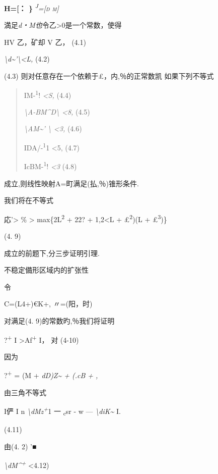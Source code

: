 \documentclass{article}
\begin{document}
\textbf{H={[}： \}} \emph{\textsc{\textsuperscript{J}={[}d m{]}}}

満足\emph{d・M也}令乙\textgreater{}0是一个常数，使得

\textbar{}\textbar{}H\textbar{}\textbar{}V 乙，\textbar{}\textbar{}矿却
V 乙， (4.1)

\emph{\textbackslash{}d\textasciitilde{}'\textbackslash{}\textless{}L,}
(4.2)

(4.3) 则对任意存在一个依赖于£，内,％的正常数凯 如果下列不等式

\begin{quote}
IM-\textsuperscript{1}! \emph{\textless{}S,} (4.4)

\emph{\textbackslash{}A-BM\^{}D\textbackslash{} \textless{}8,} (4.5)

\emph{\textbackslash{}AM\textasciitilde{}' \textbackslash{}
\textless{}3,} (4.6)

IDA/-\textsuperscript{1}1 \textless{}5, (4.7)

IcBM-\textsuperscript{1}! \emph{\textless{}3} (4.8)
\end{quote}

成立,则线性映射A=町满足(払,％)锥形条件.

我们将在不等式

応'\textgreater{} \% \textgreater{} max\{2L\textsuperscript{2} + 22? +
1,2\textless{}L + £\textsuperscript{2})(L + £\textsuperscript{3})\}

(4. 9)

成立的前题下,分三步证明引理.

不稳定備形区域内的扩张性

令

C=(L4+)€K+, 〃=(阳，时)

对满足(4. 9)的常数旳,％我们将证明

\textbar{}?\textsuperscript{+} I
\textgreater{}A\textbar{}f\textsuperscript{+} I， 对 (4-10)

因为

?\textsuperscript{+} = (M + \emph{dD)Z\textasciitilde{} + (.cB + ,}

由三角不等式

I俨 I n \emph{\textbackslash{}dMz\textsuperscript{+}}1 一
\textbar{}\textsubscript{c}sr \textbar{} - w \textbar{} ---
\emph{\textbackslash{}diK\textasciitilde{}} I.

(4.11)

由(4. 2) '■

\emph{\textbackslash{}dM\^{}\textsuperscript{+}} \textless{}4.12)
\end{document}

